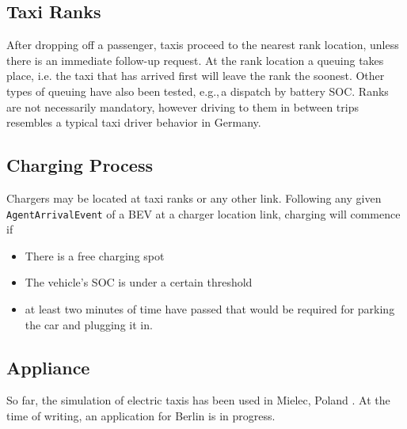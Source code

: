 \subsection{Taxi Ranks}
After dropping off a passenger, taxis proceed to the nearest rank location, unless there is an immediate follow-up request. At the rank location a queuing takes place, i.e. the taxi that has arrived first will leave the rank the soonest. Other types of queuing have also been tested, e.g.,\,a dispatch by battery SOC.
Ranks are not necessarily mandatory, however driving to them in between trips resembles a typical taxi driver behavior in Germany.

\subsection{Charging Process}
Chargers may be located at taxi ranks or any other link. Following any given \lstinline$AgentArrivalEvent$ of a BEV at a charger location link, charging will commence if
%
\begin{itemize}
	\item There is a free charging spot
	\item The vehicle's SOC is under a certain threshold
	\item at least two minutes of time have passed that would be required for parking the car and plugging it in.
\end{itemize}

\subsection{Appliance}
So far, the simulation of electric taxis has been used in Mielec, Poland \citep[][]{Bischoff2013MaTaxis, BischoffMaciejewskiEcabMielecMobilTUM}. At the time of writing, an application for Berlin is in progress.


